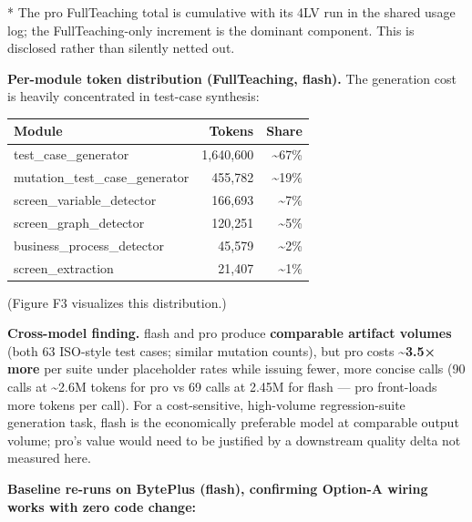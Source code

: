 \documentclass[
]{article}
\newcounter{none} %
\begin{document}
* The pro FullTeaching total is cumulative with its 4LV run in the
shared usage log; the FullTeaching-only increment is the dominant
component. This is disclosed rather than silently netted out.

\textbf{Per-module token distribution (FullTeaching, flash).} The
generation cost is heavily concentrated in test-case synthesis:

{\def\LTcaptype{none} %
\begin{longtable}[]{@{}lrr@{}}
\toprule\noalign{}
Module & Tokens & Share \\
\midrule\noalign{}
\endhead
\bottomrule\noalign{}
\endlastfoot
test\_case\_generator & 1,640,600 & \textasciitilde67\% \\
mutation\_test\_case\_generator & 455,782 & \textasciitilde19\% \\
screen\_variable\_detector & 166,693 & \textasciitilde7\% \\
screen\_graph\_detector & 120,251 & \textasciitilde5\% \\
business\_process\_detector & 45,579 & \textasciitilde2\% \\
screen\_extraction & 21,407 & \textasciitilde1\% \\
\end{longtable}
}

(Figure F3 visualizes this distribution.)

\textbf{Cross-model finding.} flash and pro produce \textbf{comparable
artifact volumes} (both 63 ISO-style test cases; similar mutation
counts), but pro costs \textbf{\textasciitilde3.5× more} per suite under
placeholder rates while issuing fewer, more concise calls (90 calls at
\textasciitilde2.6M tokens for pro vs 69 calls at 2.45M for flash ---
pro front-loads more tokens per call). For a cost-sensitive, high-volume
regression-suite generation task, flash is the economically preferable
model at comparable output volume; pro's value would need to be
justified by a downstream quality delta not measured here.

\textbf{Baseline re-runs on BytePlus (flash), confirming Option-A wiring
works with zero code change:}
\end{document}
